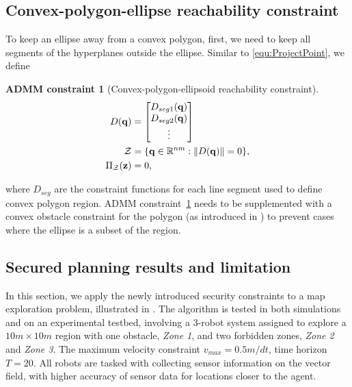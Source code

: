 \documentclass[10pt,twocolumn,twoside]{IEEEtran}
\newtheorem{constraint}{ADMM constraint}
\def\sZ{\mathcal{Z}}
\begin{document}
\subsection{Convex-polygon-ellipse reachability constraint}\label{sec:ellipse-region-constraint} 
To keep an ellipse away from a convex polygon, first, we need to keep all segments of the hyperplanes outside the ellipse. Similar to \eqref{equ:ProjectPoint}, we define
\begin{constraint}[Convex-polygon-ellipsoid reachability constraint]\label{constraint:polygon-ellipsoid}
\begin{align}
D(\vq) &= \bmat{D_{seg1}(\vq)\\D_{seg2}(\vq)\\ \vdots} \label{eq:region_ellipsoid_constraint}\\
  \sZ &= \{\vq\in\mathbb{R}^{nm}:\norm{D(\vq)} = 0 \},\\
   \Pi_\sZ(\vz) & = 0, 
\end{align}
\end{constraint}
where $D_{seg}$ are the constraint functions for each line segment used to define convex polygon region. ADMM constraint~\ref{constraint:polygon-ellipsoid} needs to be supplemented with a convex obstacle constraint for the polygon (as introduced in \cite{yang2020multi}) to prevent cases where the ellipse is a subset of the region.

\subsection{Secured planning results and limitation}\label{sec:ADMM-simulation}

In this section, we apply the newly introduced security constraints to a map exploration problem, illustrated in . The algorithm is tested in both simulations and on an experimental testbed, involving a 3-robot system assigned to explore a $10m\times10m$ region with one obstacle, \emph{Zone 1}, and two forbidden zones, \emph{Zone 2} and \emph{Zone 3}. The maximum velocity constraint $v_{max}=0.5m/dt$, time horizon $T=20$. All robots are tasked with collecting sensor information on the vector field, with higher accuracy of sensor data for locations closer to the agent. %
\end{document}
